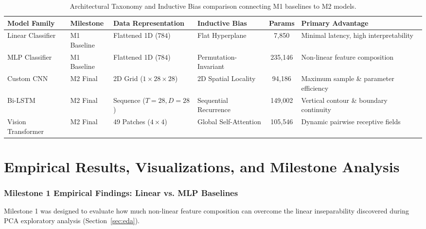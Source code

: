 \documentclass[11pt, a4paper]{article}
\begin{document}
\begin{table}[H]
  \centering
  \caption{Architectural Taxonomy and Inductive Bias comparison connecting M1 baselines to M2 models.}
  \label{tab:arch_taxonomy}
  \small
  \begin{tabularx}{\textwidth}{@{}l p{2.2cm} p{2.8cm} p{3.2cm} c X@{}}
    \toprule
    \textbf{Model Family} & \textbf{Milestone} & \textbf{Data Representation} & \textbf{Inductive Bias} & \textbf{Params} & \textbf{Primary Advantage} \\
    \midrule
    Linear Classifier & M1 Baseline & Flattened 1D ($784$) & Flat Hyperplane & 7,850 & Minimal latency, high interpretability \\
    MLP Classifier & M1 Baseline & Flattened 1D ($784$) & Permutation-Invariant & 235,146 & Non-linear feature composition \\
    Custom CNN & M2 Final & 2D Grid ($1 \times 28 \times 28$) & 2D Spatial Locality & 94,186 & Maximum sample \& parameter efficiency \\
    Bi-LSTM & M2 Final & Sequence ($T=28, D=28$) & Sequential Recurrence & 149,002 & Vertical contour \& boundary continuity \\
    Vision Transformer & M2 Final & 49 Patches ($4 \times 4$) & Global Self-Attention & 105,546 & Dynamic pairwise receptive fields \\
    \bottomrule
  \end{tabularx}
\end{table}

\newpage
\part{Empirical Results, Visualizations, and Milestone Analysis}
\label{part:results}

\section{Milestone 1 Empirical Findings: Linear vs. MLP Baselines}
\label{sec:m1_results}

Milestone 1 was designed to evaluate how much non-linear feature composition can overcome the linear inseparability discovered during PCA exploratory analysis (Section~\ref{sec:eda}).
\end{document}
